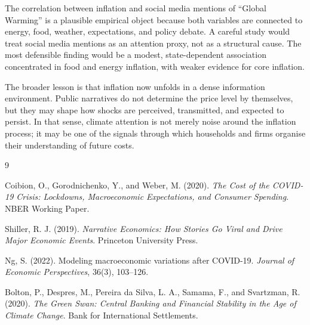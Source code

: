 \documentclass[12pt]{article}
\begin{document}
The correlation between inflation and social media mentions of ``Global Warming'' is a plausible empirical object because both variables are connected to energy, food, weather, expectations, and policy debate. A careful study would treat social media mentions as an attention proxy, not as a structural cause. The most defensible finding would be a modest, state-dependent association concentrated in food and energy inflation, with weaker evidence for core inflation.

The broader lesson is that inflation now unfolds in a dense information environment. Public narratives do not determine the price level by themselves, but they may shape how shocks are perceived, transmitted, and expected to persist. In that sense, climate attention is not merely noise around the inflation process; it may be one of the signals through which households and firms organise their understanding of future costs.

\begin{thebibliography}{9}

Coibion, O., Gorodnichenko, Y., and Weber, M. (2020).
\textit{The Cost of the COVID-19 Crisis: Lockdowns, Macroeconomic Expectations, and Consumer Spending}.
NBER Working Paper.

Shiller, R. J. (2019).
\textit{Narrative Economics: How Stories Go Viral and Drive Major Economic Events}.
Princeton University Press.

Ng, S. (2022).
Modeling macroeconomic variations after COVID-19.
\textit{Journal of Economic Perspectives}, 36(3), 103--126.

Bolton, P., Despres, M., Pereira da Silva, L. A., Samama, F., and Svartzman, R. (2020).
\textit{The Green Swan: Central Banking and Financial Stability in the Age of Climate Change}.
Bank for International Settlements.

\end{thebibliography}
\end{document}
